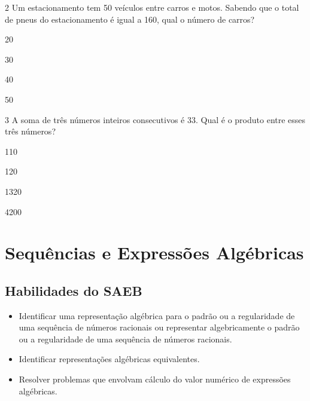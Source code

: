 \pagebreak
\num{2} Um estacionamento tem 50 veículos entre carros e motos. Sabendo que o
total de pneus do estacionamento é igual a 160, qual o número de
carros?

\begin{escolha}

  \item 20

  \item 30

  \item 40

  \item 50

\end{escolha}

\num{3} A soma de três números inteiros consecutivos é 33. Qual é o produto
entre esses três números?

\begin{escolha}
  \item 110

  \item 120

  \item 1320

  \item 4200
\end{escolha}


\chapter{Sequências e Expressões Algébricas}

\section{Habilidades do SAEB}

\begin{itemize}
  \item Identificar uma representação algébrica para o padrão ou a
regularidade de uma sequência de números racionais ou representar
algebricamente o padrão ou a regularidade de uma sequência de
números racionais. 
  \item Identificar representações algébricas equivalentes. 
  \item Resolver problemas que envolvam cálculo do valor numérico de
expressões algébricas. 
\end{itemize} 

